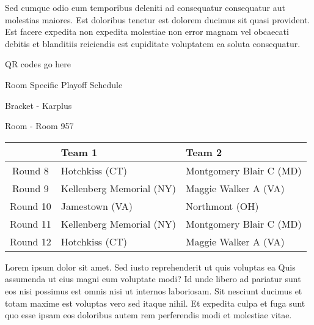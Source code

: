 \documentclass{article}%
\begin{document}
\newline%
Sed cumque odio eum temporibus deleniti ad consequatur consequatur aut molestias maiores. Est doloribus tenetur est dolorem ducimus sit quasi provident. Est facere expedita non expedita molestiae non error magnam vel obcaecati debitis et blanditiis reiciendis est cupiditate voluptatem ea soluta consequatur.%
\vspace*{140pt}%
\begin{center}%
\begin{Huge}%
QR codes go here%
\end{Huge}%
\end{center}%
\newpage%
\begin{center}%
\begin{Huge}%
Room Specific Playoff Schedule%
\end{Huge}%
\vspace*{8pt}%
\linebreak%
\begin{Large}%
Bracket {-} Karplus%
\end{Large}%
\vspace*{8pt}%
\linebreak%
\vspace*{8pt}%
\begin{Large}%
Room {-} Room 957%
\end{Large}%
\end{center}%
%
\begin{tabularx}{\textwidth}{|c|Y|Y|}%
\hline%
&Team 1&Team 2\\%
\hline%
Round 8&Hotchkiss (CT)&Montgomery Blair C (MD)\\%
Round 9&Kellenberg Memorial (NY)&Maggie Walker A (VA)\\%
Round 10&Jamestown (VA)&Northmont (OH)\\%
Round 11&Kellenberg Memorial (NY)&Montgomery Blair C (MD)\\%
Round 12&Hotchkiss (CT)&Maggie Walker A (VA)\\%
\hline%
\end{tabularx}%
\vspace*{8pt}%
\newline%
Lorem ipsum dolor sit amet. Sed iusto reprehenderit ut quis voluptas ea Quis assumenda ut eius magni eum voluptate modi? Id unde libero ad pariatur sunt eos nisi possimus est omnis nisi ut internos laboriosam. Sit nesciunt ducimus et totam maxime est voluptas vero sed itaque nihil. Et expedita culpa et fuga sunt quo esse ipsam eos doloribus autem rem perferendis modi et molestiae vitae.\newline%
\end{document}
